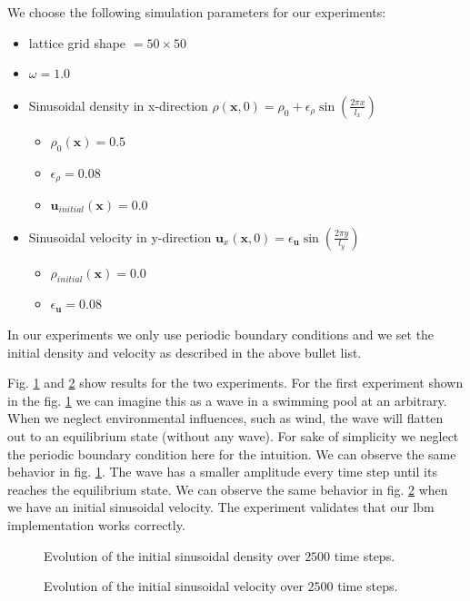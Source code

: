\documentclass[a4paper,11pt, footsepline]{book}
\begin{document}
We choose the following simulation parameters for our experiments:
\begin{itemize}
\setlength\itemsep{0.15em}
\item lattice grid shape $=50\times 50$
\item $\omega=1.0$
\item Sinusoidal density in x-direction $\rho(\mathbf{x},0)=\rho_{0}+\epsilon_{\rho}\sin(\frac{2\pi x}{l_x})$
\begin{itemize}
\setlength\itemsep{0.1em}
\item $\rho_{0}(\mathbf{x})=0.5$
\item $\epsilon_{\rho}=0.08$
\item $\mathbf{u}_{initial}(\mathbf{x})=0.0$
\end{itemize}
\item Sinusoidal velocity in y-direction $\mathbf{u}_{x}(\mathbf{x},0)=\epsilon_{\mathbf{u}}\sin(\frac{2\pi y}{l_y})$
\begin{itemize}
\setlength\itemsep{0.1em}
\item $\rho_{initial}(\mathbf{x})=0.0$
\item $\epsilon_{\mathbf{u}}=0.08$
\end{itemize}
\end{itemize}

In our experiments we only use periodic boundary conditions and we set the initial density and velocity as described in the above bullet list.

Fig. \ref{fig:evolution_density_surface} and \ref{fig:evolution_velocity_surface} show results for the two experiments. For the first experiment shown in the fig. \ref{fig:evolution_density_surface} we can imagine this as a wave in a swimming pool at an arbitrary. When we neglect environmental influences, such as wind, the wave will flatten out to an equilibrium state (without any wave). For sake of simplicity we neglect the periodic boundary condition here for the intuition. We can observe the same behavior in fig. \ref{fig:evolution_density_surface}. The wave has a smaller amplitude every time step until its reaches the equilibrium state. We can observe the same behavior in fig. \ref{fig:evolution_velocity_surface} when we have an initial sinusoidal velocity. The experiment validates that our \ac{lbm} implementation works correctly.
\begin{figure}
  \begin{center}
	\scalebox{0.7}{}
   \caption{Evolution of the initial sinusoidal density over $2500$ time steps.}
  \label{fig:evolution_density_surface}
  \end{center}
\end{figure}
\begin{figure}
  \begin{center}
	\scalebox{0.7}{}
   \caption{Evolution of the initial sinusoidal velocity over $2500$ time steps.}
  \label{fig:evolution_velocity_surface}
  \end{center}
\end{figure}
\end{document}
